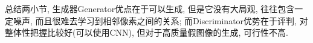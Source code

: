 总结两小节, 生成器Generator优点在于可以生成, 但是它没有大局观, 往往包含一定噪声, 而且很难去学习到相邻像素之间的关系; 而Discriminator优势在于评判, 对整体性把握比较好(可以使用CNN), 但对于高质量假图像的生成, 可行性不高. 

